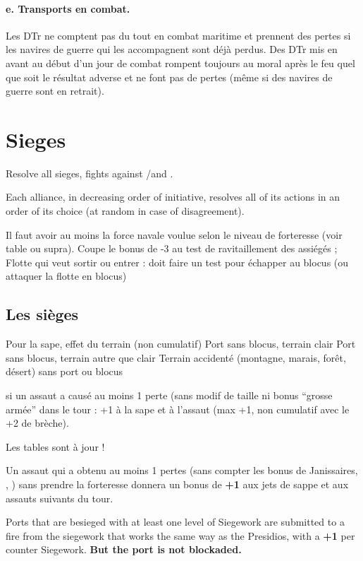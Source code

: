 \paragraph{e. Transports en combat.}
Les DTr ne comptent pas du tout en combat maritime et prennent des pertes si les
navires de guerre qui les accompagnent sont déjà perdus.
Des DTr mis en avant au début d'un jour de combat rompent toujours au moral
après le feu quel que soit le résultat adverse et ne font pas de pertes (même si des
navires de guerre sont en retrait).

\section{Sieges}
\label{chMilitary:Sieges}
Resolve all sieges, fights against \REVOLT/\REBELLION and \corsaire.

Each alliance, in decreasing order of initiative, resolves all of its actions
in an order of its choice (at random in case of disagreement).

\aparag[Blocus]
Il faut avoir au moins la force navale voulue selon le niveau de forteresse
(voir table ou supra).
\bparag Coupe le bonus de -3 au test de ravitaillement des assiégés ;
\bparag Flotte qui veut sortir ou entrer : doit faire un test pour échapper au blocus
(ou attaquer la flotte en blocus)

\subsection{Les sièges}
\aparag Pour la sape, effet du terrain (non cumulatif)
      Port sans blocus, terrain clair
      Port sans blocus, terrain autre que clair
 Terrain accidenté (montagne, marais, forêt, désert) sans port
ou blocus

\aparag[TBD] si un assaut a causé au moins 1 perte (sans modif de
taille ni bonus ``grosse armée'' dans le tour : +1 à la sape et à
l'assaut (max +1, non cumulatif avec le +2 de brèche).


\aparag Les tables sont à jour !

\aparag[Expérimental]
Un assaut qui a obtenu au moins 1 pertes (sans compter les bonus
de Janissaires, \RUS, \POL) sans prendre la forteresse donnera un
bonus de {\bf +1} aux jets de sappe et aux assauts suivants du tour.

Ports that are besieged with at least one level of Siegework are
submitted to a fire from the siegework that works the same way as the
Presidios, with a {\bf +1} per counter Siegework\faceplus.  {\bf But the
 port is not blockaded.}

